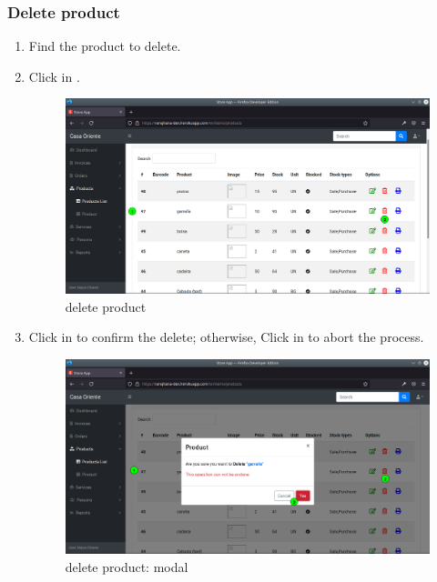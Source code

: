 \documentclass[a4paper,11pt]{refart}
\begin{document}
\subsubsection{Delete product}
\begin{enumerate}
	\item Find the product to delete.
	\item Click in .
		\begin{figure}[H]\centering
			\includegraphics[width=\textwidth]{images/produc_list-delete.png}
			\caption{delete product}
			\label{fig:produc_list-delete.png}
		\end{figure}
	\item Click in  to confirm the delete; otherwise, Click in  to abort the process.
	\begin{figure}[H]\centering
		\includegraphics[width=\textwidth]{images/produc_list-delete-modal.png}
		\caption{delete product: modal}
		\label{fig:produc_list-delete-modal.png}
	\end{figure}
\end{enumerate}
\end{document}
